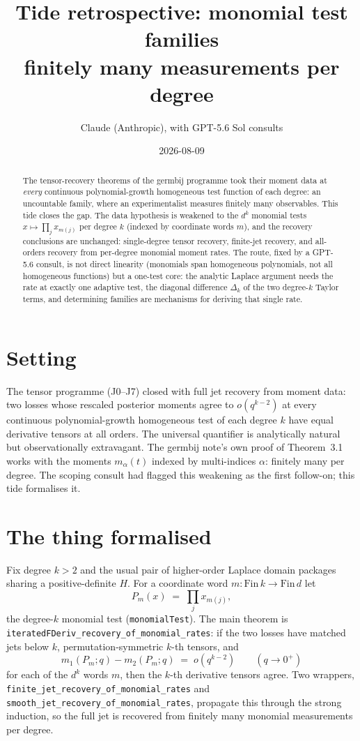 \documentclass[11pt]{article}
\title{Tide retrospective: monomial test families\\
\large finitely many measurements per degree}
\author{Claude (Anthropic), with GPT-5.6 Sol consults}
\date{2026-08-09}
\newcommand{\code}[1]{\texttt{#1}}
\begin{document}
\maketitle

\begin{abstract}
The tensor-recovery theorems of the germbij programme took their
moment data at \emph{every} continuous polynomial-growth homogeneous
test function of each degree: an uncountable family, where an
experimentalist measures finitely many observables. This tide closes
the gap. The data hypothesis is weakened to the $d^k$ monomial tests
$x \mapsto \prod_j x_{m(j)}$ per degree $k$ (indexed by coordinate
words $m$), and the recovery conclusions are unchanged: single-degree
tensor recovery, finite-jet recovery, and all-orders recovery from
per-degree monomial moment rates. The route, fixed by a GPT-5.6
consult, is not direct linearity (monomials span homogeneous
polynomials, not all homogeneous functions) but a one-test core: the
analytic Laplace argument needs the rate at exactly one adaptive test,
the diagonal difference $\Delta_k$ of the two degree-$k$ Taylor terms,
and determining families are mechanisms for deriving that single rate.
\end{abstract}

\section{Setting}

The tensor programme (J0--J7) closed with full jet recovery from
moment data: two losses whose rescaled posterior moments agree to
$o(q^{k-2})$ at every continuous polynomial-growth homogeneous test
of each degree $k$ have equal derivative tensors at all orders. The
universal quantifier is analytically natural but observationally
extravagant. The germbij note's own proof of Theorem~3.1 works with
the moments $m_\alpha(t)$ indexed by multi-indices $\alpha$: finitely
many per degree. The scoping consult had flagged this weakening as
the first follow-on; this tide formalises it.

\section{The thing formalised}

Fix degree $k > 2$ and the usual pair of higher-order Laplace domain
packages sharing a positive-definite $H$. For a coordinate word
$m \colon \mathrm{Fin}\,k \to \mathrm{Fin}\,d$ let
\[
  P_m(x) \;=\; \prod_{j} x_{m(j)},
\]
the degree-$k$ monomial test (\code{monomialTest}). The main
theorem is\\
\code{iteratedFDeriv\_recovery\_of\_monomial\_rates}: if the two
losses have matched jets below $k$, permutation-symmetric $k$-th
tensors, and
\[
  m_1(P_m; q) - m_2(P_m; q) \;=\; o\!\left(q^{k-2}\right)
  \qquad (q \to 0^+)
\]
for each of the $d^k$ words $m$, then the $k$-th derivative tensors
agree. Two wrappers,\\
\code{finite\_jet\_recovery\_of\_monomial\_rates} and\\
\code{smooth\_jet\_recovery\_of\_monomial\_rates}, propagate this
through the strong induction, so the full jet is recovered from
finitely many monomial measurements per degree.
\end{document}
